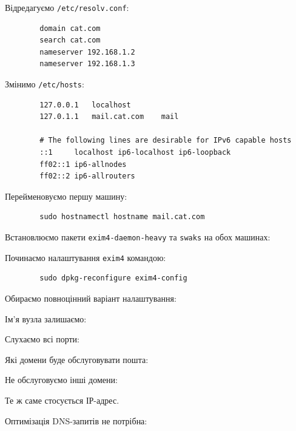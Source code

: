 \documentclass[14pt, a4paper]{extreport}
\begin{document}
	
	Відредагуємо \texttt{/etc/resolv.conf}:
	
	\begin{verbatim}
		domain cat.com
		search cat.com
		nameserver 192.168.1.2
		nameserver 192.168.1.3
	\end{verbatim}
	
	Змінимо \texttt{/etc/hosts}:
	
	\begin{verbatim}
		127.0.0.1	localhost
		127.0.1.1	mail.cat.com	mail
		
		# The following lines are desirable for IPv6 capable hosts
		::1     localhost ip6-localhost ip6-loopback
		ff02::1 ip6-allnodes
		ff02::2 ip6-allrouters
	\end{verbatim}
	
	Перейменовуємо першу машину:
	
	\begin{verbatim}
		sudo hostnamectl hostname mail.cat.com
	\end{verbatim}
	
	Встановлюємо пакети \texttt{exim4-daemon-heavy} та \texttt{swaks} на обох машинах:
	
	
	Починаємо налаштування \texttt{exim4} командою:
	
	\begin{verbatim}
		sudo dpkg-reconfigure exim4-config
	\end{verbatim}
	
	Обираємо повноцінний варіант налаштування:
	
	
	Ім'я вузла залишаємо:
	
	
	Слухаємо всі порти:
	
	
	Які домени буде обслуговувати пошта:
	
	
	Не обслуговуємо інші домени:
	
	
	Те ж саме стосується ІР-адрес.
	
	
	Оптимізація DNS-запитів не потрібна:
	
	
\end{document}
